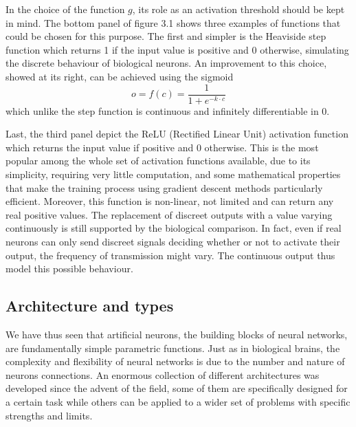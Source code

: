 \documentclass[a4paper,10pt]{report}
\begin{document}
In the choice of the function $g$, its role as an activation threshold should be kept in mind.
The bottom panel of figure 3.1 shows three examples of functions that could be chosen for this purpose.
The first and simpler is the Heaviside step function which
returns 1 if the input value is positive and 0 otherwise, simulating the discrete behaviour of 
biological neurons.
An improvement to this choice, showed at its right, can be achieved using the sigmoid
\begin{equation}
    o = f(c) = \frac{1}{1+e^{-k\cdot c}}
\end{equation}
which unlike the step function is continuous and infinitely differentiable in 0.

Last, the third panel depict the ReLU (Rectified Linear Unit) activation function which returns the input value if 
positive and 0 otherwise. This is the most popular among the whole set of activation functions available, due to its simplicity, requiring very little computation, and some mathematical properties that make the training process using gradient
descent methods particularly efficient.
Moreover, this function is non-linear, not limited and can return any real positive values.
The replacement of discreet outputs with a value varying continuously is still supported by the biological comparison.
In fact, even if real neurons can only send discreet signals deciding whether or not to activate their output, 
the frequency of transmission might vary. The continuous output thus model this possible behaviour.

\subsection{Architecture and types}

We have thus seen that artificial neurons, the building blocks of neural networks,
are fundamentally simple parametric functions.
Just as in biological brains, the complexity and flexibility
of neural networks is due to the number and nature of neurons connections.
An enormous collection of different architectures was developed since the advent of the field,
some of them are specifically designed for a certain task while others can be applied
to a wider set of problems with specific strengths and limits.
\end{document}
